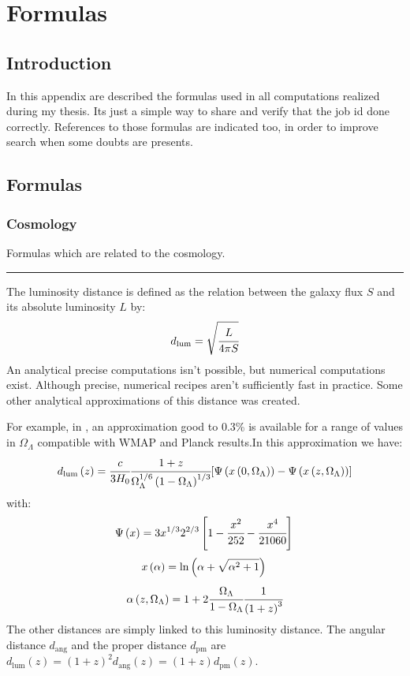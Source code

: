 \chapter{Formulas}


\section{Introduction}

In this appendix are described the formulas used in all computations realized during my thesis. Its just a simple way to share and
verify that the job id done correctly. References to those formulas are indicated too, in order to improve search when some doubts
are presents.

\section{Formulas}

\subsection{Cosmology}
Formulas which are related to the cosmology.

\noindent\rule{\linewidth}{1pt}
The luminosity distance is defined as the relation between the galaxy flux $S$ and its absolute luminosity
$L$ by:
\begin{equation}
	d_{\mathrm{lum}}=\sqrt{\cfrac{L}{4\pi{S}}}
\end{equation}
An analytical precise computations isn't possible, but numerical computations exist. Although precise, numerical recipes aren't
sufficiently fast in practice. Some other analytical approximations of this distance was created.

For example, in \citet{WU10}, an approximation good to 0.3\% is available for a range of values in $\Omega_\Lambda$ compatible
with WMAP and Planck results.In this approximation we have:
\begin{equation}
	d_{\mathrm{lum}}\left({z}\right)=\cfrac{c}{3H_0}\cfrac{1+z}{\Omega_\Lambda^{1/6}\left({1-\Omega_\Lambda}\right)^{1/3}}[\Psi\left({x\left({0,\Omega_\Lambda}\right)}\right)-\Psi\left({x\left({z,\Omega_\Lambda}\right)}\right)]
\end{equation}
with:
\begin{equation}
	\Psi\left({x}\right)=3x^{1/3}{2^{2/3}}\left[1-\cfrac{x^2}{252}-\cfrac{x^4}{21060}\right]\\
\end{equation}
\begin{equation}
	x\left({\alpha}\right)=\ln\left({\alpha+\sqrt{\alpha^2+1}}\right)\\
\end{equation}
\begin{equation}
	\alpha\left({z,\Omega_\Lambda}\right)=1+2\cfrac{\Omega_\Lambda}{1-\Omega_\Lambda}\cfrac{1}{\left(1+z\right)^3}
\end{equation}
The other distances are simply linked to this luminosity distance. The angular distance $d_{\mathrm{ang}}$ and the proper distance
$d_{\mathrm{pm}}$ are $d_{\mathrm{lum}}(z)={(1+z)}^2d_{\mathrm{ang}}(z)=(1+z)d_{\mathrm{pm}}(z)$.

